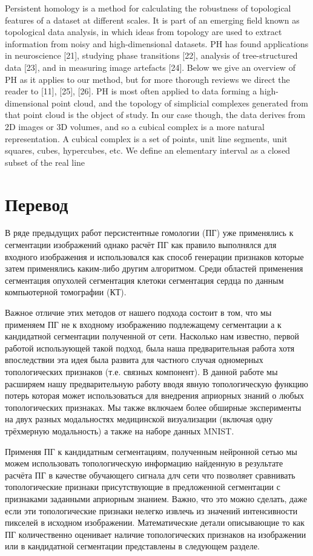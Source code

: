 \documentclass[12pt,a4paper]{article}
\begin{document}
Persistent homology is a method for calculating the robustness of topological features of a dataset at different scales. It
is part of an emerging field known as topological data analysis, 
in which ideas from topology are used to extract information from noisy and high-dimensional datasets. PH has
found applications in neuroscience [21], studying phase
transitions [22], analysis of tree-structured data [23], and in
measuring image artefacts [24]. Below we give an overview
of PH as it applies to our method, but for more thorough
reviews we direct the reader to [11], [25], [26].
PH is most often applied to data forming a high-dimensional point cloud, and the topology of simplicial complexes
generated from that point cloud is the object of study. In our
case though, the data derives from 2D images or 3D volumes, and so a cubical complex is a more natural representation.
 A cubical complex is a set of points, unit line
segments, unit squares, cubes, hypercubes, etc. We define
an elementary interval as a closed subset of the real line 

\section*{Перевод}

В ряде предыдущих работ персистентные гомологии (ПГ) уже
применялись к сегментации изображений однако расчёт ПГ как
правило выполнялся для входного изображения и использовался как
способ генерации признаков которые затем применялись каким-либо
другим алгоритмом. Среди областей применения сегментация
опухолей сегментация клетоки сегментация сердца по
данным компьютерной томографии (КТ).

Важное отличие этих методов от нашего подхода состоит в том, что мы
применяем ПГ не к входному изображению подлежащему сегментации а
к кандидатной сегментации полученной от сети. Насколько нам
известно, первой работой использующей такой подход, была наша
предварительная работа хотя впоследствии эта идея была развита
для частного случая одномерных топологических признаков (т.е.
связных компонент). В данной работе мы расширяем нашу
предварительную работу вводя явную топологическую функцию
потерь которая может использоваться для внедрения априорных знаний
о любых топологических признаках. Мы также включаем более обширные
эксперименты на двух разных модальностях медицинской визуализации
(включая одну трёхмерную модальность) а также на наборе данных
MNIST.

Применяя ПГ к кандидатным сегментациям, полученным нейронной сетью
мы можем использовать топологическую информацию найденную в
результате расчёта ПГ в качестве обучающего сигнала длч сети что
позволяет сравнивать топологические признаки присутствующие в
предложенной сегментации с признаками заданными априорным знанием.
Важно, что это можно сделать, даже если эти топологические признаки
нелегко извлечь из значений интенсивности пикселей в исходном
изображении. Математические детали описывающие то как ПГ
количественно оценивает наличие топологических признаков на
изображении или в кандидатной сегментации представлены в следующем
разделе.
\end{document}

